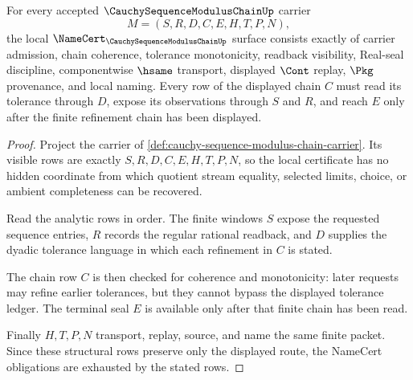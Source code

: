 \begin{theorem}
\label{thm:cauchy-sequence-modulus-chain-namecert-obligations}
For every accepted $\CauchySequenceModulusChainUp$ carrier
$$
M=(S,R,D,C,E,H,T,P,N),
$$
the local $\NameCert_{\CauchySequenceModulusChainUp}$ surface consists exactly of carrier admission, chain coherence, tolerance monotonicity, readback visibility, Real-seal discipline, componentwise $\hsame$ transport, displayed $\Cont$ replay, $\Pkg$ provenance, and local naming. Every row of the displayed chain $C$ must read its tolerance through $D$, expose its observations through $S$ and $R$, and reach $E$ only after the finite refinement chain has been displayed.
\end{theorem}
\begin{proof}
Project the carrier of \autoref{def:cauchy-sequence-modulus-chain-carrier}. Its visible rows are exactly $S,R,D,C,E,H,T,P,N$, so the local certificate has no hidden coordinate from which quotient stream equality, selected limits, choice, or ambient completeness can be recovered.

Read the analytic rows in order. The finite windows $S$ expose the requested sequence entries, $R$ records the regular rational readback, and $D$ supplies the dyadic tolerance language in which each refinement in $C$ is stated.

The chain row $C$ is then checked for coherence and monotonicity: later requests may refine earlier tolerances, but they cannot bypass the displayed tolerance ledger. The terminal seal $E$ is available only after that finite chain has been read.

Finally $H,T,P,N$ transport, replay, source, and name the same finite packet. Since these structural rows preserve only the displayed route, the NameCert obligations are exhausted by the stated rows.
\end{proof}

